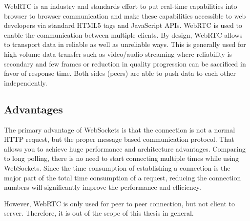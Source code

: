 WebRTC is an industry and standards effort to put real-time capabilities into browser to browser communication and make these capabilities accessible to web developers via standard HTML5 tags and JavaScript APIs\cite{johnston2012webrtc}. 
WebRTC is used to enable the communication between multiple clients. By design, WebRTC allows to transport data in reliable as well as unreliable ways. This is generally used for high volume data transfer such as video/audio streaming where reliability is secondary and few frames or reduction in quality progression can be sacrificed in favor of response time. Both sides (peers) are able to push data to each other independently.

\subsection{Advantages}

The primary advantage of WebSockets is that the connection is not a normal HTTP request, but the proper message based communication protocol. That allows you to achieve huge performance and architecture advantages. Comparing to long polling, there is no need to start connecting multiple times while using WebSockets. Since the time consumption of establishing a connection is the major part of the total time consumption of a request, reducing the connection numbers will significantly improve the performance and efficiency. 

However, WebRTC is only used for peer to peer connection, but not client to server. Therefore, it is out of the scope of this thesis in general.